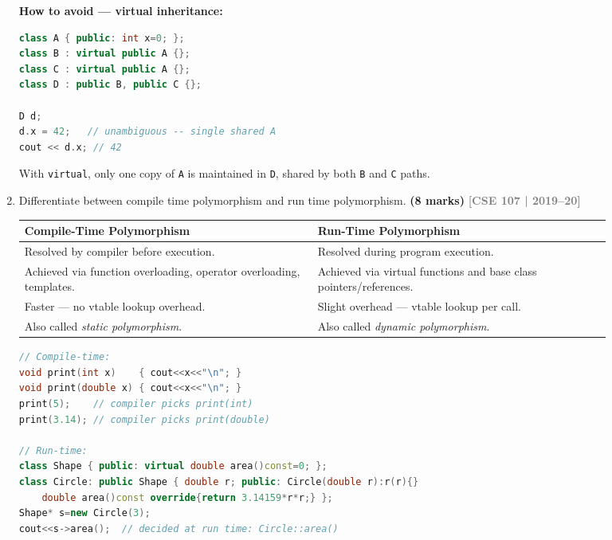 \documentclass[12pt,a3paper]{article}
\newcommand{\yr}[1]{\hfill\textcolor{gray}{\small\textbf{[#1]}}}
\newcommand{\mk}[1]{\textcolor{orange!70!black}{\small\textbf{(#1 marks)}}}
\begin{document}
\begin{enumerate}
\begin{tcolorbox}
\textbf{How to avoid --- virtual inheritance:}
\begin{lstlisting}[language=C++]
class A { public: int x=0; };
class B : virtual public A {};
class C : virtual public A {};
class D : public B, public C {};

D d;
d.x = 42;   // unambiguous -- single shared A
cout << d.x; // 42
\end{lstlisting}

With \texttt{virtual}, only one copy of \texttt{A} is maintained
in \texttt{D}, shared by both \texttt{B} and \texttt{C} paths.

\end{tcolorbox}

\item Differentiate between compile time polymorphism and run time polymorphism. \mk{8}
\yr{CSE 107 | 2019--20}
\begin{tcolorbox}[enhanced,breakable,ansbox,colback=cG!4,colframe=cG,
  boxrule=0.8pt,arc=5pt,
  title={\textbf{Answer --- Compile-time vs run-time polymorphism}},
  fonttitle=\bfseries\color{white},colbacktitle=cG]

\begin{center}
\small
\begin{tabular}{@{}p{0.44\linewidth}p{0.44\linewidth}@{}}
\toprule
\textbf{Compile-Time Polymorphism} & \textbf{Run-Time Polymorphism} \\
\midrule
Resolved by compiler before execution. &
Resolved during program execution. \\[3pt]
Achieved via function overloading, operator overloading, templates. &
Achieved via virtual functions and base class pointers/references. \\[3pt]
Faster --- no vtable lookup overhead. &
Slight overhead --- vtable lookup per call. \\[3pt]
Also called \emph{static polymorphism}. &
Also called \emph{dynamic polymorphism}. \\
\bottomrule
\end{tabular}
\end{center}

\begin{lstlisting}[language=C++]
// Compile-time:
void print(int x)    { cout<<x<<"\n"; }
void print(double x) { cout<<x<<"\n"; }
print(5);    // compiler picks print(int)
print(3.14); // compiler picks print(double)

// Run-time:
class Shape { public: virtual double area()const=0; };
class Circle: public Shape { double r; public: Circle(double r):r(r){}
    double area()const override{return 3.14159*r*r;} };
Shape* s=new Circle(3);
cout<<s->area();  // decided at run time: Circle::area()
\end{lstlisting}


\end{tcolorbox}
\end{enumerate}
\end{document}
